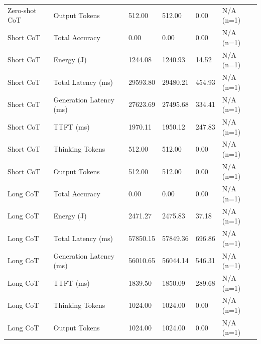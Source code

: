\begin{table}
\begin{tabular}{llllll}
Zero-shot CoT & Output Tokens & 512.00 & 512.00 & 0.00 & N/A (n=1) \\
Short CoT & Total Accuracy & 0.00 & 0.00 & 0.00 & N/A (n=1) \\
Short CoT & Energy (J) & 1244.08 & 1240.93 & 14.52 & N/A (n=1) \\
Short CoT & Total Latency (ms) & 29593.80 & 29480.21 & 454.93 & N/A (n=1) \\
Short CoT & Generation Latency (ms) & 27623.69 & 27495.68 & 334.41 & N/A (n=1) \\
Short CoT & TTFT (ms) & 1970.11 & 1950.12 & 247.83 & N/A (n=1) \\
Short CoT & Thinking Tokens & 512.00 & 512.00 & 0.00 & N/A (n=1) \\
Short CoT & Output Tokens & 512.00 & 512.00 & 0.00 & N/A (n=1) \\
Long CoT & Total Accuracy & 0.00 & 0.00 & 0.00 & N/A (n=1) \\
Long CoT & Energy (J) & 2471.27 & 2475.83 & 37.18 & N/A (n=1) \\
Long CoT & Total Latency (ms) & 57850.15 & 57849.36 & 696.86 & N/A (n=1) \\
Long CoT & Generation Latency (ms) & 56010.65 & 56044.14 & 546.31 & N/A (n=1) \\
Long CoT & TTFT (ms) & 1839.50 & 1850.09 & 289.68 & N/A (n=1) \\
Long CoT & Thinking Tokens & 1024.00 & 1024.00 & 0.00 & N/A (n=1) \\
Long CoT & Output Tokens & 1024.00 & 1024.00 & 0.00 & N/A (n=1) \\
\bottomrule
\end{tabular}
\end{table}
